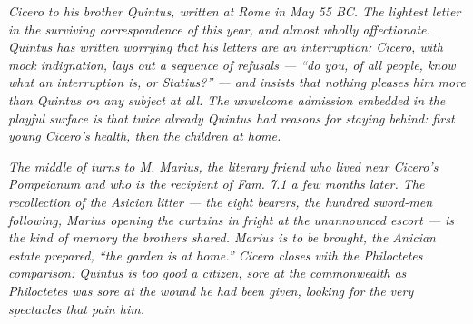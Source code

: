 
\textit{Cicero to his brother Quintus, written at Rome in May 55
BC. The lightest letter in the surviving correspondence of this
year, and almost wholly affectionate. Quintus has written
worrying that his letters are an interruption; Cicero, with mock
indignation, lays out a sequence of refusals --- ``do you, of all
people, know what an interruption is, or Statius?'' --- and
insists that nothing pleases him more than Quintus on any subject
at all. The unwelcome admission embedded in the playful surface
is that twice already Quintus had reasons for staying behind:
first young Cicero's health, then the children at home.}

\textit{The middle of  turns to M. Marius, the
literary friend who lived near Cicero's Pompeianum and who is
the recipient of \textit{Fam.} 7.1 a few months later. The
recollection of the Asician litter --- the eight bearers, the
hundred sword-men following, Marius opening the curtains in
fright at the unannounced escort --- is the kind of memory the
brothers shared. Marius is to be brought, the Anician estate
prepared, ``the garden is at home.'' Cicero closes with the
Philoctetes comparison: Quintus is too good a citizen, sore at
the commonwealth as Philoctetes was sore at the wound he had
been given, looking for the very spectacles that pain him.}
